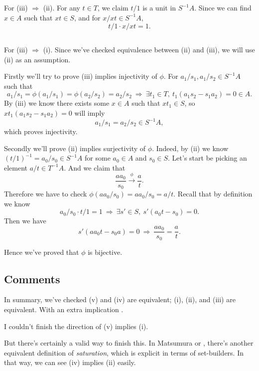 \subsection{}

For (iii) $\Rightarrow$ (ii). For any $t\in T$, we claim $t/1$ is a unit in $S^{-1}A$. Since we can find $x\in A$ such that $xt\in S$, and for $x/xt\in S^{-1}A$,
\[t/1\cdot x/xt = 1.\]

\subsection{}

For (iii) $\Rightarrow$ (i). Since we've checked equivalence between (ii) and (iii), we will use (ii) as an assumption.

Firstly we'll try to prove (iii) implies injectivity of $\phi$. For $a_1/s_1,a_1/s_2\in S^{-1}A$ such that \[a_1/s_1=\phi(a_1/s_1)=\phi(a_2/s_2)=a_2/s_2 ~\Rightarrow~ \exists t_1\in T,~ t_1(a_1s_2-s_1a_2)=0\in A.\]
By (iii) we know there exists some $x\in A$ such that $xt_1\in S$, so $xt_1(a_1s_2-s_1a_2)=0$ will imply \[a_1/s_1=a_2/s_2\in S^{-1}A,\] which proves injectivity.

Secondly we'll prove (ii) implies surjectivity of $\phi$.
Indeed, by (ii) we know $(t/1)^{-1}=a_0/s_0\in S^{-1}A$ for some $a_0\in A$ and $s_0\in S$. Let's start be picking an element $a/t\in T^{-1}A$. And we claim that \[\frac{aa_0}{s_0}\overset{\phi}{\rightarrow}\frac{a}{t}.\] Therefore we have to check $\phi(aa_0/s_0)=aa_0/s_0=a/t$. Recall that by definition we know \[a_0/s_0\cdot t/1=1 ~\Rightarrow~ \exists s'\in S,~ s'(a_0t-s_0)=0.\] Then we have \[s'(aa_0t-s_0a)=0 ~\Rightarrow~ \frac{aa_0}{s_0}=\frac{a}{t}.\]

Hence we've proved that $\phi$ is bijective. 

\subsection{Comments}

In summary, we've checked (v) and (iv) are equivalent; (i), (ii), and (iii) are equivalent. With an extra implication . 

I couldn't finish the direction of (v) implies (i). 

But there's certainly a valid way to finish this. In Matsumura \cite{matsumura1989commutative} or \cite{altman}, there's another equivalent definition of \textit{saturation}, which is explicit in terms of set-builders. In that way, we can see (iv) implies (ii) easily. 

